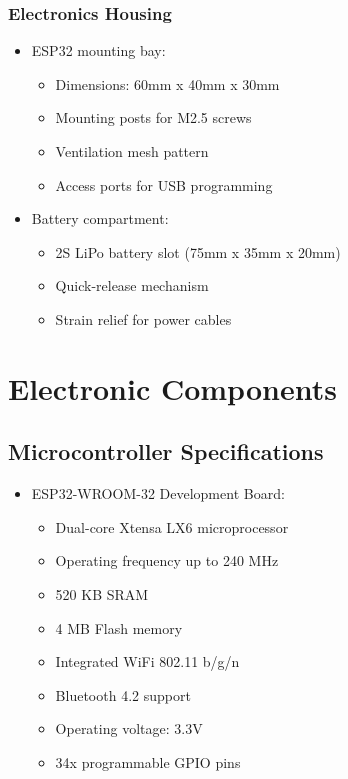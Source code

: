 \documentclass[12pt,a4paper]{report}
\begin{document}
\subsubsection{Electronics Housing}
\begin{itemize}
\item ESP32 mounting bay:
\begin{itemize}
\item Dimensions: 60mm x 40mm x 30mm
\item Mounting posts for M2.5 screws
\item Ventilation mesh pattern
\item Access ports for USB programming
\end{itemize}
\item Battery compartment:
\begin{itemize}
    \item 2S LiPo battery slot (75mm x 35mm x 20mm)
    \item Quick-release mechanism
    \item Strain relief for power cables
\end{itemize}
\end{itemize}
\section{Electronic Components}
\subsection{Microcontroller Specifications}
\begin{itemize}
\item ESP32-WROOM-32 Development Board:
\begin{itemize}
\item Dual-core Xtensa LX6 microprocessor
\item Operating frequency up to 240 MHz
\item 520 KB SRAM
\item 4 MB Flash memory
\item Integrated WiFi 802.11 b/g/n
\item Bluetooth 4.2 support
\item Operating voltage: 3.3V
\item 34x programmable GPIO pins
\end{itemize}
\end{itemize}
\end{document}
